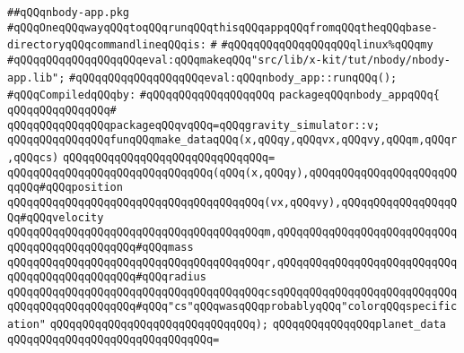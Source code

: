 \label{src/lib/x-kit/tut/nbody/nbody-app.pkg}
\verb|##qQQqnbody-app.pkg|\newline
\verb|#qQQqOneqQQqwayqQQqtoqQQqrunqQQqthisqQQqappqQQqfromqQQqtheqQQqbase-directoryqQQqcommandlineqQQqis:|\newline
\verb|#|\newline
\verb|#qQQqqQQqqQQqqQQqqQQqlinux%qQQqmy|\newline
\verb|#qQQqqQQqqQQqqQQqqQQqeval:qQQqmakeqQQq"src/lib/x-kit/tut/nbody/nbody-app.lib";|\newline
\verb|#qQQqqQQqqQQqqQQqqQQqeval:qQQqnbody_app::runqQQq();|\newline
\newline
\verb|#qQQqCompiledqQQqby:|\newline
\verb|#qQQqqQQqqQQqqQQqqQQq|\newline
\newline
\verb|packageqQQqnbody_appqQQq{|\newline
\verb|qQQqqQQqqQQqqQQq#|\newline
\verb|qQQqqQQqqQQqqQQqpackageqQQqvqQQq=qQQqgravity_simulator::v;|\newline
\newline
\verb|qQQqqQQqqQQqqQQqfunqQQqmake_dataqQQq(x,qQQqy,qQQqvx,qQQqvy,qQQqm,qQQqr,qQQqcs)|\newline
\verb|qQQqqQQqqQQqqQQqqQQqqQQqqQQqqQQq=|\newline
\verb|qQQqqQQqqQQqqQQqqQQqqQQqqQQqqQQq(qQQq(x,qQQqy),qQQqqQQqqQQqqQQqqQQqqQQqqQQq#qQQqposition|\newline
\verb|qQQqqQQqqQQqqQQqqQQqqQQqqQQqqQQqqQQqqQQq(vx,qQQqvy),qQQqqQQqqQQqqQQqqQQq#qQQqvelocity|\newline
\verb|qQQqqQQqqQQqqQQqqQQqqQQqqQQqqQQqqQQqqQQqm,qQQqqQQqqQQqqQQqqQQqqQQqqQQqqQQqqQQqqQQqqQQqqQQq#qQQqmass|\newline
\verb|qQQqqQQqqQQqqQQqqQQqqQQqqQQqqQQqqQQqqQQqr,qQQqqQQqqQQqqQQqqQQqqQQqqQQqqQQqqQQqqQQqqQQqqQQq#qQQqradius|\newline
\verb|qQQqqQQqqQQqqQQqqQQqqQQqqQQqqQQqqQQqqQQqcsqQQqqQQqqQQqqQQqqQQqqQQqqQQqqQQqqQQqqQQqqQQqqQQq#qQQq"cs"qQQqwasqQQqprobablyqQQq"colorqQQqspecification"|\newline
\verb|qQQqqQQqqQQqqQQqqQQqqQQqqQQqqQQq);|\newline
\newline
\verb|qQQqqQQqqQQqqQQqplanet_data|\newline
\verb|qQQqqQQqqQQqqQQqqQQqqQQqqQQqqQQq=|\newline

